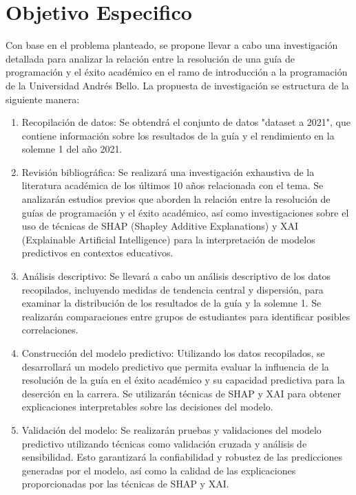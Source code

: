 \hypertarget{objetivo_especifico}{%
    \section{Objetivo Especifico}\label{Objetivo Especifico}}

Con base en el problema planteado, se propone llevar a cabo una investigación detallada para analizar la relación entre la resolución de una guía de programación y el éxito académico en el ramo de introducción a la programación de la Universidad Andrés Bello. La propuesta de investigación se estructura de la siguiente manera:

\begin{enumerate}
    \item Recopilación de datos: Se obtendrá el conjunto de datos "dataset a 2021", que contiene información sobre los resultados de la guía y el rendimiento en la solemne 1 del año 2021.

    \item Revisión bibliográfica: Se realizará una investigación exhaustiva de la literatura académica de los últimos 10 años relacionada con el tema. Se analizarán estudios previos que aborden la relación entre la resolución de guías de programación y el éxito académico, así como investigaciones sobre el uso de técnicas de SHAP (Shapley Additive Explanations) y XAI (Explainable Artificial Intelligence) para la interpretación de modelos predictivos en contextos educativos.

    \item Análisis descriptivo: Se llevará a cabo un análisis descriptivo de los datos recopilados, incluyendo medidas de tendencia central y dispersión, para examinar la distribución de los resultados de la guía y la solemne 1. Se realizarán comparaciones entre grupos de estudiantes para identificar posibles correlaciones.

    \item Construcción del modelo predictivo: Utilizando los datos recopilados, se desarrollará un modelo predictivo que permita evaluar la influencia de la resolución de la guía en el éxito académico y su capacidad predictiva para la deserción en la carrera. Se utilizarán técnicas de SHAP y XAI para obtener explicaciones interpretables sobre las decisiones del modelo.

    \item Validación del modelo: Se realizarán pruebas y validaciones del modelo predictivo utilizando técnicas como validación cruzada y análisis de sensibilidad. Esto garantizará la confiabilidad y robustez de las predicciones generadas por el modelo, así como la calidad de las explicaciones proporcionadas por las técnicas de SHAP y XAI.


\end{enumerate}
